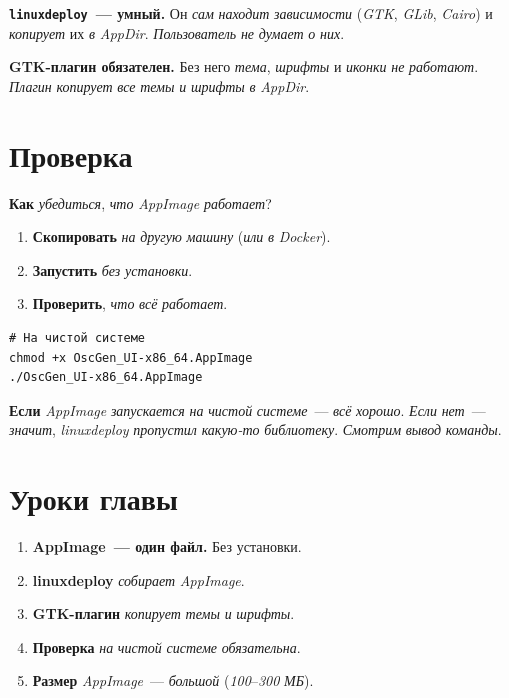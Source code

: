 \begin{keybox}
\textbf{\texttt{linuxdeploy}~--- умный.} Он \emph{сам} \emph{находит}
\emph{зависимости} (\emph{GTK}, \emph{GLib}, \emph{Cairo}) и
\emph{копирует} их \emph{в} \emph{AppDir}.
\emph{Пользователь} \emph{не} \emph{думает} \emph{о} \emph{них}.
\end{keybox}

\begin{warnbox}
\textbf{GTK-плагин обязателен.} Без него \emph{тема},
\emph{шрифты} и \emph{иконки} \emph{не} \emph{работают}.
\emph{Плагин} \emph{копирует} \emph{все} \emph{темы} \emph{и}
\emph{шрифты} \emph{в} \emph{AppDir}.
\end{warnbox}

\section{Проверка}
\label{sec:appimage-test}

\textbf{Как} \emph{убедиться}, \emph{что} \emph{AppImage}
\emph{работает}?

\begin{enumerate}
    \item \textbf{Скопировать} \emph{на} \emph{другую} \emph{машину}
          (\emph{или} \emph{в} \emph{Docker}).
    \item \textbf{Запустить} \emph{без} \emph{установки}.
    \item \textbf{Проверить}, \emph{что} \emph{всё} \emph{работает}.
\end{enumerate}

\begin{verbatim}
# На чистой системе
chmod +x OscGen_UI-x86_64.AppImage
./OscGen_UI-x86_64.AppImage
\end{verbatim}

\begin{ideabox}
\textbf{Если} \emph{AppImage} \emph{запускается} \emph{на}
\emph{чистой} \emph{системе}~--- \emph{всё} \emph{хорошо}.
\emph{Если} \emph{нет}~--- \emph{значит}, \emph{linuxdeploy}
\emph{пропустил} \emph{какую-то} \emph{библиотеку}.
\emph{Смотрим} \emph{вывод} \emph{команды}.
\end{ideabox}

\section{Уроки главы}
\label{sec:appimage-lessons}

\begin{enumerate}
    \item \textbf{AppImage~--- один файл.} Без установки.
    \item \textbf{linuxdeploy} \emph{собирает} \emph{AppImage}.
    \item \textbf{GTK-плагин} \emph{копирует} \emph{темы}
          \emph{и} \emph{шрифты}.
    \item \textbf{Проверка} \emph{на} \emph{чистой} \emph{системе}
          \emph{обязательна}.
    \item \textbf{Размер} \emph{AppImage}~--- \emph{большой}
          (\emph{100}--\emph{300} \emph{МБ}).
\end{enumerate}


